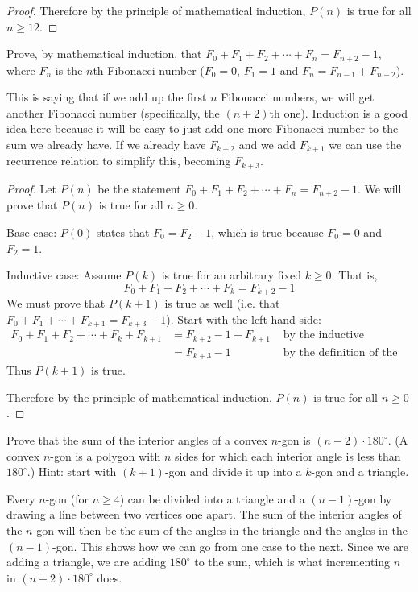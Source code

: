 \documentclass[10pt]{exam}
\begin{document}
\begin{questions}
\begin{solution}
\begin{proof}
    Therefore by the principle of mathematical induction, $P(n)$ is true for all $n \ge 12$.
  \end{proof}
\end{solution}


\question[8] Prove, by mathematical induction, that $F_0 + F_1 + F_2 + \cdots + F_{n} = F_{n+2} - 1$, where $F_n$ is the $n$th Fibonacci number ($F_0 = 0$, $F_1 = 1$ and $F_n = F_{n-1} + F_{n-2}$).
\begin{solution}
This is saying that if we add up the first $n$ Fibonacci numbers, we will get another Fibonacci number (specifically, the $(n+2)$th one).  Induction is a good idea here because it will be easy to just add one more Fibonacci number to the sum we already have.  If we already have $F_{k+2}$ and we add $F_{k+1}$ we can use the recurrence relation to simplify this, becoming $F_{k+3}$.

  \begin{proof}
    Let $P(n)$ be the statement $F_0 + F_1 + F_2 + \cdots + F_n = F_{n+2} - 1$.  We will prove that $P(n)$ is true for all $n \ge 0$.

    Base case: $P(0)$ states that $F_0 = F_2 - 1$, which is true because $F_0 = 0$ and $F_2 = 1$.

    Inductive case:  Assume $P(k)$ is true for an arbitrary fixed $k \ge 0$.  That is, \[F_0 + F_1 + F_2 + \cdots + F_k = F_{k+2} - 1\]
    We must prove that $P(k+1)$ is true as well (i.e. that $F_0 + F_1 + \cdots +F_{k+1} = F_{k+3} - 1$).  Start with the left hand side:
    \begin{align*}
      F_0 + F_1 + F_2 + \cdots + F_k + F_{k+1} & = F_{k+2} - 1 + F_{k+1} & \mbox{ by the inductive hypothesis}\\
      & = F_{k+3} - 1 & \mbox{ by the definition of the Fibonacci numbers}
    \end{align*}
    Thus $P(k+1)$ is true.

    Therefore by the principle of mathematical induction, $P(n)$ is true for all $n \ge 0$.
  \end{proof}

\end{solution}

\question[8] Prove that the sum of the interior angles of a convex $n$-gon is $(n-2)\cdot 180^\circ$.  (A convex $n$-gon is a polygon with $n$ sides for which each interior angle is less than $180^\circ$.)  Hint: start with $(k+1)$-gon and divide it up into a $k$-gon and a triangle.

\begin{solution}
Every $n$-gon (for $n \ge 4$) can be divided into a triangle and a $(n-1)$-gon by drawing a line between two vertices one apart.  The sum of the interior angles of the $n$-gon will then be the sum of the angles in the triangle and the angles in the $(n-1)$-gon.  This shows how we can go from one case to the next.  Since we are adding a triangle, we are adding $180^\circ$ to the sum, which is what incrementing $n$ in $(n-2)\cdot 180^\circ$ does.


\end{solution}
\end{questions}
\end{document}
